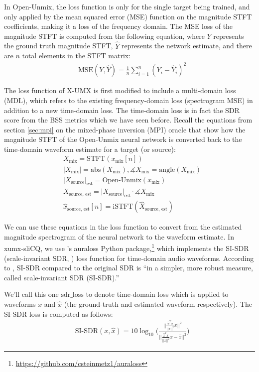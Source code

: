 \documentclass[report.tex]{subfiles}
\begin{document}
In Open-Unmix, the loss function is only for the single target being trained, and only applied by the mean squared error (MSE) function on the magnitude STFT coefficients, making it a loss of the frequency domain. The MSE loss of the magnitude STFT is computed from the following equation, where $Y$ represents the ground truth magnitude STFT, $\hat{Y}$ represents the network estimate, and there are $n$ total elements in the STFT matrix:
\begin{align}
	\nonumber & \text{MSE}(Y, \hat{Y}) = \frac{1}{n} \sum_{i = 1}^{n}{(Y_{i}-\hat{Y}_{i})^{2}}
\end{align}

The loss function of X-UMX is first modified to include a multi-domain loss (MDL), which refers to the existing frequency-domain loss (spectrogram MSE) in addition to a new time-domain loss. The time-domain loss is in fact the SDR score from the BSS metrics which we have seen before. Recall the equations from section \ref{sec:mpi} on the mixed-phase inversion (MPI) oracle that show how the magnitude STFT of the Open-Unmix neural network is converted back to the time-domain waveform estimate for a target (or source):
\begin{align}
	\nonumber & X_{\text{mix}} = \text{STFT}(x_{\text{mix}}[n])\\
	\nonumber & |X_{\text{mix}}| = \text{abs}(X_{\text{mix}}), \measuredangle{X_{\text{mix}}} = \text{angle}(X_{\text{mix}})\\
	\nonumber & {|X_{\text{source}}|}_{\text{est}} = \text{Open-Unmix}(x_{\text{mix}})\\
	\nonumber & X_{\text{source, est}} = {|X_{\text{source}}|}_{\text{est}} \cdot \measuredangle{X_{\text{mix}}}\\
	\nonumber & \hat{x}_{\text{source, est}}[n] = \text{iSTFT}(\hat{X}_{\text{source, est}})
\end{align}

We can use these equations in the loss function to convert from the estimated magnitude spectrogram of the neural network to the waveform estimate. In xumx-sliCQ, we use \textcite{auraloss}'s auraloss Python package,\footnote{\url{https://github.com/csteinmetz1/auraloss}} which implements the SI-SDR (scale-invariant SDR, \cite{roux2018sdr}) loss function for time-domain audio waveforms. According to \textcite{roux2018sdr}, SI-SDR compared to the original SDR is ``in a simpler, more robust measure, called scale-invariant SDR (SI-SDR).''

We'll call this one $\text{sdr\_loss}$ to denote time-domain loss which is applied to waveforms $x$ and $\hat{x}$ (the ground-truth and estimated waveform respectively). The SI-SDR loss is computed as follows:
\begin{align}
	\nonumber & \text{SI-SDR}(x, \hat{x}) = 10 \log_{10}\Big(\frac{||\frac{\hat{x}^{T}x}{||x||^{2}} x||^{2}}{||\frac{\hat{x}^{T}x}{||x||^{2}} x - \hat{x}||^{2}}\Big)
\end{align}
\end{document}

